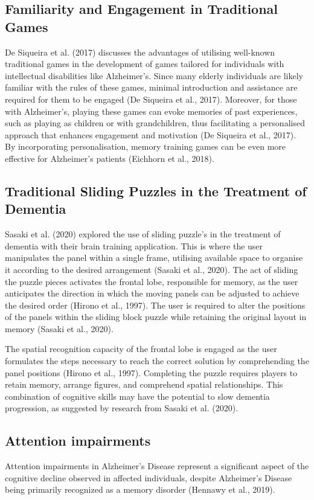 \documentclass{l4proj}
\begin{document}
\subsection{Familiarity and Engagement in Traditional Games}\label{sec:traditional_games}
De Siqueira et al. (2017) discusses the advantages of utilising well-known traditional games in the development of games tailored for individuals with intellectual disabilities like Alzheimer's. Since many elderly individuals are likely familiar with the rules of these games, minimal introduction and assistance are required for them to be engaged (De Siqueira et al., 2017). Moreover, for those with Alzheimer's, playing these games can evoke memories of past experiences, such as playing as children or with grandchildren, thus facilitating a personalised approach that enhances engagement and motivation (De Siqueira et al., 2017). By incorporating personalisation, memory training games can be even more effective for Alzheimer's patients (Eichhorn et al., 2018).


\subsection{Traditional Sliding Puzzles in the Treatment of Dementia}\label{sec:sliding_dementia}

Sasaki et al. (2020) explored the use of sliding puzzle's in the treatment of dementia with their brain training application. This is where the user manipulates the panel within a single frame, utilising available space to organise it according to the desired arrangement (Sasaki et al., 2020). The act of sliding the puzzle pieces activates the frontal lobe, responsible for memory, as the user anticipates the direction in which the moving panels can be adjusted to achieve the desired order (Hirono et al., 1997). The user is required to alter the positions of the panels within the sliding block puzzle while retaining the original layout in memory (Sasaki et al., 2020).

The spatial recognition capacity of the frontal lobe is engaged as the user formulates the steps necessary to reach the correct solution by comprehending the panel positions (Hirono et al., 1997). Completing the puzzle requires players to retain memory, arrange figures, and comprehend spatial relationships. This combination of cognitive skills may have the potential to slow dementia progression, as suggested by research from Sasaki et al. (2020).


\subsection{Attention impairments}\label{sec:attention}
Attention impairments in Alzheimer’s Disease represent a significant aspect of the cognitive decline observed in affected individuals, despite Alzheimer’s Disease being primarily recognized as a memory disorder (Hennawy et al., 2019).
\end{document}

